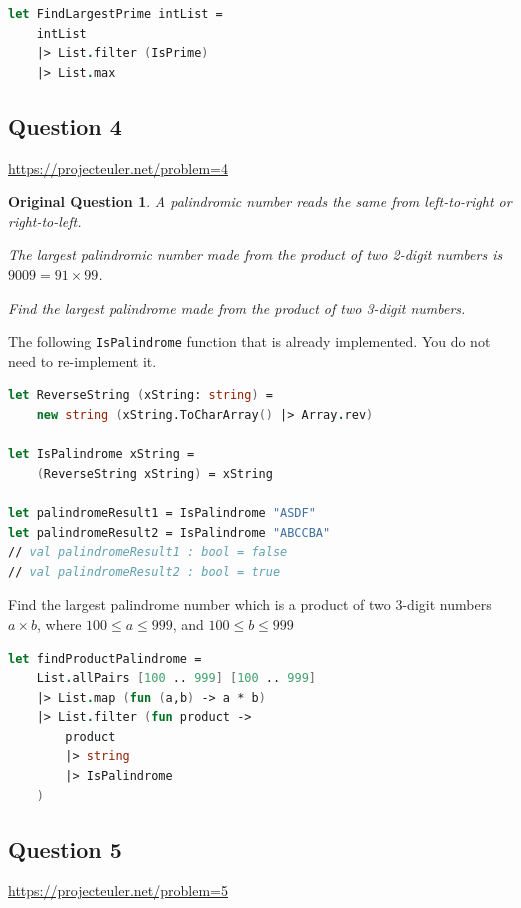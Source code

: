 \documentclass[12pt]{article}
\newtheorem*{origQuestion*}{Original Question}
\begin{document}
\begin{lstlisting}[language=FSharp]
let FindLargestPrime intList =
    intList
    |> List.filter (IsPrime)
    |> List.max
\end{lstlisting}

\pagebreak
\subsection*{Question 4} 
\url{https://projecteuler.net/problem=4}
\begin{origQuestion*}
A palindromic number reads the same from left-to-right or right-to-left. 

The largest palindromic number made from the product of two 2-digit numbers is $9009 = 91 \times 99$.

Find the largest palindrome made from the product of two 3-digit numbers.
\end{origQuestion*}

The following \texttt{IsPalindrome} function that is already implemented. You do not need to re-implement it.
\begin{lstlisting}[language=FSharp]
let ReverseString (xString: string) =
    new string (xString.ToCharArray() |> Array.rev)

let IsPalindrome xString =
    (ReverseString xString) = xString

let palindromeResult1 = IsPalindrome "ASDF"   
let palindromeResult2 = IsPalindrome "ABCCBA" 
// val palindromeResult1 : bool = false
// val palindromeResult2 : bool = true
\end{lstlisting}
Find the largest palindrome number which is a product of two 3-digit numbers $a \times b$, where $100 \leq a \leq 999$, and $100 \leq b \leq 999$
\begin{lstlisting}[language=FSharp]
let findProductPalindrome =
    List.allPairs [100 .. 999] [100 .. 999]
    |> List.map (fun (a,b) -> a * b)
    |> List.filter (fun product ->
        product
        |> string
        |> IsPalindrome
    )
\end{lstlisting}
\pagebreak
\subsection*{Question 5} 
\url{https://projecteuler.net/problem=5}
\end{document}
